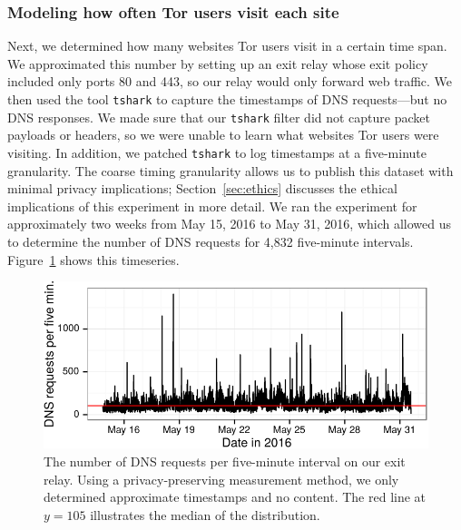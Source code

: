 \subsubsection{Modeling how often Tor users visit each site}
\label{sec:load-freq}
Next, we determined how many websites Tor users visit in a certain time span.
We approximated this number by setting up an exit relay whose exit policy
included only ports 80 and 443, so our relay would only forward web traffic.  We
then used the tool {\tt tshark} to capture the timestamps of DNS requests---but
no DNS responses.  We made sure that our {\tt tshark} filter did not capture
packet payloads or headers, so we were unable to learn what websites Tor users
were visiting.  In addition, we patched {\tt tshark} to log timestamps at a
five-minute granularity. The coarse timing granularity allows us to publish this
dataset with minimal privacy implications; Section~\ref{sec:ethics} discusses
the ethical implications of this experiment in more detail.  We ran the
experiment for approximately two weeks from May 15, 2016 to May 31, 2016, which
allowed us to determine the number of DNS requests for 4,832 five-minute
intervals.  Figure~\ref{fig:dns-reqs} shows this timeseries.

\begin{figure}[t]
	\centering
	\includegraphics[width=\linewidth]{figures/dns-reqs.pdf}
	\caption{The number of DNS requests per five-minute interval on our
	exit relay.  Using a privacy-preserving measurement method, we only
	determined approximate timestamps and no content.  The red line at $y = 105$
	illustrates the median of the distribution.}
	\label{fig:dns-reqs}
\end{figure}

